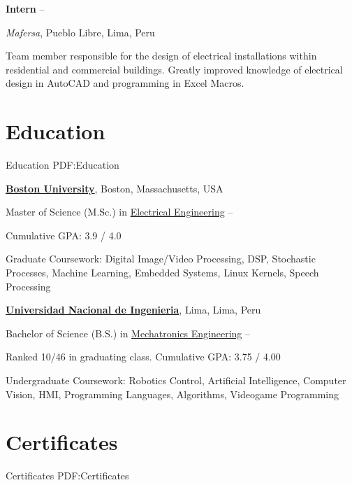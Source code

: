 \documentclass[letterpaper,MMMyyyy,nonstop]{simpleresumecv}
\begin{document}
\begin{body}
\BigGap
\textbf{Intern}
\hfill
{} --
\begin{detail}
\normalsize{ \textit{Mafersa},
Pueblo Libre, Lima, Peru }
\end{detail}

\GapNoBreak
\BulletItem
Team member responsible for the design of electrical installations within residential and commercial buildings.
\BulletItem
Greatly improved knowledge of electrical design in AutoCAD and programming in Excel Macros.


\section
{Education}
{Education}
{PDF:Education}

\href{http://www.bu.edu/}
{\textbf{Boston University}},
Boston, Massachusetts, USA

\GapNoBreak
\BulletItem
Master of Science (M.Sc.) in
\href{http://www.bu.edu/ece/}
{Electrical Engineering}
\hfill
{} --
\begin{detail}
\SubBulletItem
Cumulative GPA: 3.9 / 4.0
\end{detail}
\BulletItem
Graduate Coursework: Digital Image/Video Processing, DSP, Stochastic Processes, Machine Learning, Embedded Systems, Linux Kernels, Speech Processing

\BigGap
\href{http://www.uni.edu.pe/}
{\textbf{Universidad Nacional de Ingenieria}},
Lima, Lima, Peru

\GapNoBreak
\BulletItem
Bachelor of Science (B.S.) in
\href{http://www.fim.uni.edu.pe/}
{Mechatronics Engineering}
\hfill
{} --
\begin{detail}
\SubBulletItem
Ranked 10/46 in graduating class.
\SubBulletItem
Cumulative GPA: 3.75 / 4.00
\end{detail}
\BulletItem
Undergraduate Coursework: Robotics Control, Artificial Intelligence, Computer Vision, HMI, Programming Languages, Algorithms, Videogame Programming


\section
{Certificates}
{Certificates}
{PDF:Certificates}


\end{body}
\end{document}
